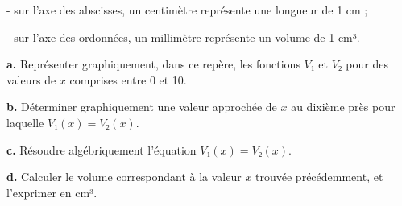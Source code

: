 \documentclass[9pt]{beamer}
\begin{document}
\begin{frame}
\begin{multicols}{3}
		- sur l'axe des abscisses, un centimètre représente une longueur de 1 cm ; \smallskip

		- sur l'axe des ordonnées, un millimètre représente un volume de 1 cm³. \smallskip

		\textbf{a.} Représenter graphiquement, dans ce repère, les fonctions $V₁$ et $V₂$ pour des valeurs de $x$ comprises entre 0 et 10.  \smallskip

		\textbf{b.} Déterminer graphiquement une valeur approchée de $x$ au dixième près pour laquelle $V₁(x) = V₂(x)$.  \smallskip

		\textbf{c.} Résoudre algébriquement l'équation $V₁(x) = V₂(x)$. \smallskip

		\textbf{d.} Calculer le volume correspondant à la valeur $x$ trouvée précédemment, et l'exprimer en cm³.  \smallskip
	\end{multicols}
\end{frame}
\end{document}

